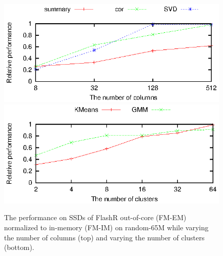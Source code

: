 \begin{figure}[t]
	\begin{center}
		\footnotesize
		\includegraphics{FlashMatrix_figs/IM-vs-EM-stat.eps}
		\includegraphics{FlashMatrix_figs/IM-vs-EM-clust.eps}
		\caption{The performance on SSDs of FlashR out-of-core  (FM-EM)
      normalized to in-memory (FM-IM) on random-65M 
      while varying the number of columns (top) and
       varying the number of clusters (bottom).}
		\label{perf:stat}
	\end{center}
  \vspace{-15pt}
\end{figure}

